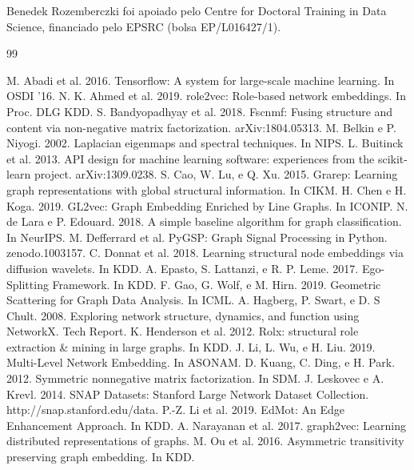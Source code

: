 \documentclass[sigconf]{acmart}
\begin{document}
\begin{acks}
Benedek Rozemberczki foi apoiado pelo Centre for Doctoral Training in Data Science, financiado pelo EPSRC (bolsa EP/L016427/1).
\end{acks}

\begin{thebibliography}{99}

 M. Abadi et al. 2016. Tensorflow: A system for large-scale machine learning. In OSDI '16.
 N. K. Ahmed et al. 2019. role2vec: Role-based network embeddings. In Proc. DLG KDD.
 S. Bandyopadhyay et al. 2018. Fscnmf: Fusing structure and content via non-negative matrix factorization. arXiv:1804.05313.
 M. Belkin e P. Niyogi. 2002. Laplacian eigenmaps and spectral techniques. In NIPS.
 L. Buitinck et al. 2013. API design for machine learning software: experiences from the scikit-learn project. arXiv:1309.0238.
 S. Cao, W. Lu, e Q. Xu. 2015. Grarep: Learning graph representations with global structural information. In CIKM.
 H. Chen e H. Koga. 2019. GL2vec: Graph Embedding Enriched by Line Graphs. In ICONIP.
 N. de Lara e P. Edouard. 2018. A simple baseline algorithm for graph classification. In NeurIPS.
 M. Defferrard et al. PyGSP: Graph Signal Processing in Python. zenodo.1003157.
 C. Donnat et al. 2018. Learning structural node embeddings via diffusion wavelets. In KDD.
 A. Epasto, S. Lattanzi, e R. P. Leme. 2017. Ego-Splitting Framework. In KDD.
 F. Gao, G. Wolf, e M. Hirn. 2019. Geometric Scattering for Graph Data Analysis. In ICML.
 A. Hagberg, P. Swart, e D. S Chult. 2008. Exploring network structure, dynamics, and function using NetworkX. Tech Report.
 K. Henderson et al. 2012. Rolx: structural role extraction \& mining in large graphs. In KDD.
 J. Li, L. Wu, e H. Liu. 2019. Multi-Level Network Embedding. In ASONAM.
 D. Kuang, C. Ding, e H. Park. 2012. Symmetric nonnegative matrix factorization. In SDM.
 J. Leskovec e A. Krevl. 2014. SNAP Datasets: Stanford Large Network Dataset Collection. http://snap.stanford.edu/data.
 P.-Z. Li et al. 2019. EdMot: An Edge Enhancement Approach. In KDD.
 A. Narayanan et al. 2017. graph2vec: Learning distributed representations of graphs.
 M. Ou et al. 2016. Asymmetric transitivity preserving graph embedding. In KDD.

\end{thebibliography}
\end{document}
